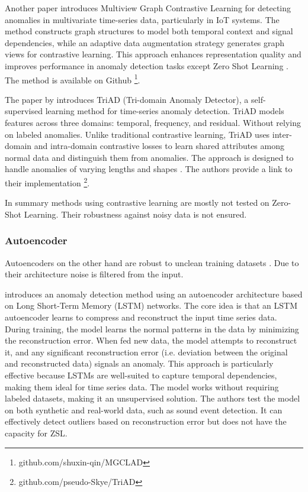 Another paper introduces Multiview Graph Contrastive Learning for detecting anomalies in multivariate time-series data, particularly in IoT systems. The method constructs graph structures to model both temporal context and signal dependencies, while an adaptive data augmentation strategy generates graph views for contrastive learning. This approach enhances representation quality and improves performance in anomaly detection tasks except Zero Shot Learning \cite{qin_multiview_2023}. The method is available on Github \footnote{\fussy\tiny github.com/shuxin-qin/MGCLAD}.

The paper by \cite{sun_unraveling_2023} introduces TriAD (Tri-domain Anomaly Detector), a self-supervised learning method for time-series anomaly detection. TriAD models features across three domains: temporal, frequency, and residual. Without relying on labeled anomalies. Unlike traditional contrastive learning, TriAD uses inter-domain and intra-domain contrastive losses to learn shared attributes among normal data and distinguish them from anomalies. The approach is designed to handle anomalies of varying lengths and shapes \cite{sun_unraveling_2023}. The authors provide a link to their implementation \footnote{\fussy\tiny github.com/pseudo-Skye/TriAD}.

In summary methods using contrastive learning are mostly not tested on Zero-Shot Learning. Their robustness against noisy data is not ensured.

\subsubsection{Autoencoder}
Autoencoders on the other hand are robust to unclean training datasets \cite[p. 2487]{abdulaal_practical_2021}. Due to their architecture noise is filtered from the input.

\cite{provotar_unsupervised_2019} introduces an anomaly detection method using an autoencoder architecture based on Long Short-Term Memory (LSTM) networks. The core idea is that an LSTM autoencoder learns to compress and reconstruct the input time series data. During training, the model learns the normal patterns in the data by minimizing the reconstruction error. When fed new data, the model attempts to reconstruct it, and any significant reconstruction error (i.e. deviation between the original and reconstructed data) signals an anomaly. This approach is particularly effective because LSTMs are well-suited to capture temporal dependencies, making them ideal for time series data. The model works without requiring labeled datasets, making it an unsupervised solution. The authors test the model on both synthetic and real-world data, such as sound event detection. It can effectively detect outliers based on reconstruction error but does not have the capacity for ZSL.


